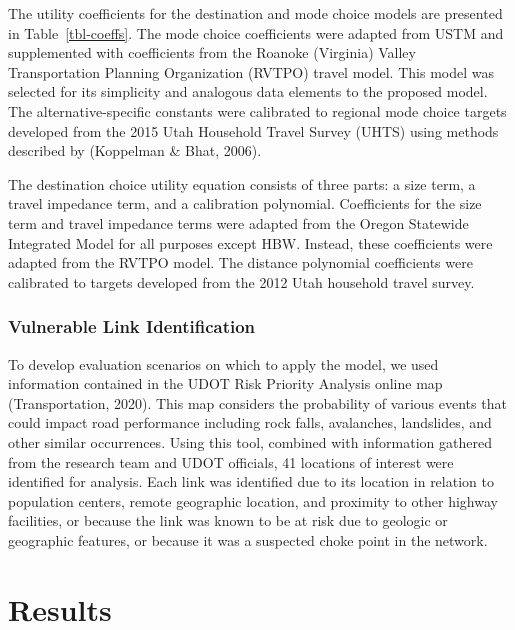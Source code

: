 \documentclass[
  letterpaper,
  number,
  review,
  3p]{elsarticle}
\begin{document}
The utility coefficients for the destination and mode choice models are
presented in Table~\ref{tbl-coeffs}. The mode choice coefficients were
adapted from USTM and supplemented with coefficients from the Roanoke
(Virginia) Valley Transportation Planning Organization (RVTPO) travel
model. This model was selected for its simplicity and analogous data
elements to the proposed model. The alternative-specific constants were
calibrated to regional mode choice targets developed from the 2015 Utah
Household Travel Survey (UHTS) using methods described by (Koppelman \&
Bhat, 2006).

The destination choice utility equation consists of three parts: a size
term, a travel impedance term, and a calibration polynomial.
Coefficients for the size term and travel impedance terms were adapted
from the Oregon Statewide Integrated Model for all purposes except HBW.
Instead, these coefficients were adapted from the RVTPO model. The
distance polynomial coefficients were calibrated to targets developed
from the 2012 Utah household travel survey.

\hypertarget{vulnerable-link-identification}{%
\subsubsection{Vulnerable Link
Identification}\label{vulnerable-link-identification}}

To develop evaluation scenarios on which to apply the model, we used
information contained in the UDOT Risk Priority Analysis online map
(Transportation, 2020). This map considers the probability of various
events that could impact road performance including rock falls,
avalanches, landslides, and other similar occurrences. Using this tool,
combined with information gathered from the research team and UDOT
officials, 41 locations of interest were identified for analysis. Each
link was identified due to its location in relation to population
centers, remote geographic location, and proximity to other highway
facilities, or because the link was known to be at risk due to geologic
or geographic features, or because it was a suspected choke point in the
network.


\hypertarget{sec-results}{%
\section{Results}\label{sec-results}}
\end{document}
